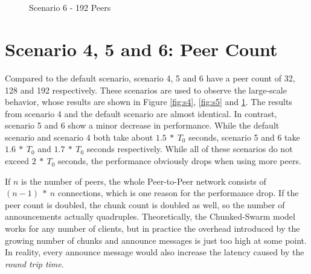 \pagebreak
\begin{figure}[!ht]
	\begin{center}	
		~ %

	 	~ %

		\caption{Scenario 6 - 192 Peers}
		\label{fig:s6}
	\end{center}
\end{figure}
\vfill

\pagebreak
\section{Scenario 4, 5 and 6: Peer Count}
\label{evaluation:456}

Compared to the default scenario, scenario 4, 5 and 6 have a peer count of 32, 128 and 192 respectively. These scenarios are used to observe the large-scale behavior, whose results are shown in Figure \ref{fig:s4}, \ref{fig:s5} and \ref{fig:s6}. The results from scenario 4 and the default scenario are almost identical. In contrast, scenario 5 and 6 show a minor decrease in performance. While the default scenario and scenario 4 both take about $1.5\:*\:T_0$ seconds, scenario 5 and 6 take $1.6\:*\:T_0$ and $1.7\:*\:T_0$ seconds respectively. While all of these scenarios do not exceed $2\:*\:T_0$ seconds, the performance obviously drops when using more peers.

If $n$ is the number of peers, the whole Peer-to-Peer network consists of $(n-1)\:*\:n$ connections, which is one reason for the performance drop. If the peer count is doubled, the chunk count is doubled as well, so the number of announcements actually quadruples. Theoretically, the Chunked-Swarm model works for any number of clients, but in practice the overhead introduced by the growing number of chunks and announce messages is just too high at some point. In reality, every announce message would also increase the latency caused by the \emph{round trip time}. 

